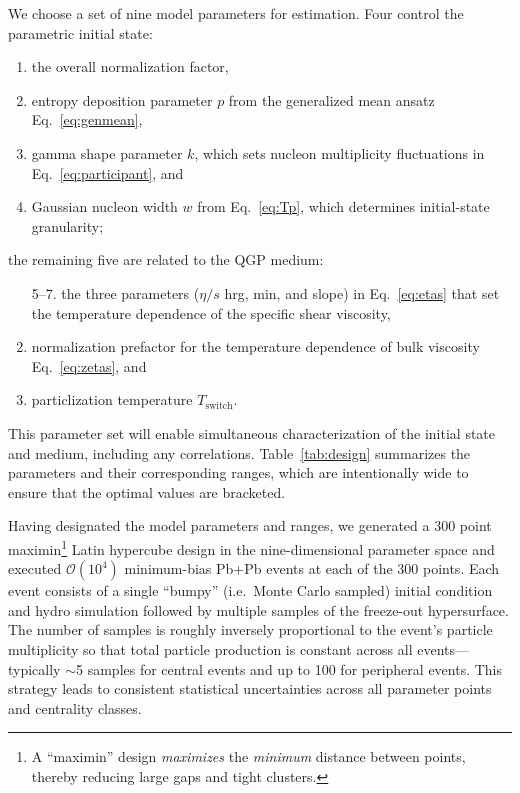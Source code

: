 \documentclass[aps,prc,reprint,amsmath,nofootinbib]{revtex4-1}
\newcommand{\order}[1]{$\mathcal O(10^{#1})$}
\begin{document}
We choose a set of nine model parameters for estimation.
Four control the parametric initial state:
\begin{enumerate}[itemsep=0pt]
  \item the overall normalization factor,
  \item entropy deposition parameter $p$ from the generalized mean ansatz Eq.~\eqref{eq:genmean},
  \item gamma shape parameter $k$, which sets nucleon multiplicity fluctuations in Eq.~\eqref{eq:participant}, and
  \item Gaussian nucleon width $w$ from Eq.~\eqref{eq:Tp}, which determines initial-state granularity;
\end{enumerate}
the remaining five are related to the QGP medium:
\begin{enumerate}[itemsep=0pt]
  \item[5--7.] the three parameters ($\eta/s$ hrg, min, and slope) in Eq.~\eqref{eq:etas} that set the temperature dependence of the specific shear viscosity,
  \setcounter{enumi}{7}
  \item normalization prefactor for the temperature dependence of bulk viscosity Eq.~\eqref{eq:zetas}, and
  \item particlization temperature $T_\text{switch}$.
\end{enumerate}
This parameter set will enable simultaneous characterization of the initial state and medium, including any correlations.
Table~\ref{tab:design} summarizes the parameters and their corresponding ranges, which are intentionally wide to ensure that the optimal values are bracketed.

Having designated the model parameters and ranges, we generated a 300 point maximin\footnote{A ``maximin'' design \emph{maximizes} the \emph{minimum} distance between points, thereby reducing large gaps and tight clusters.} Latin hypercube design \cite{Morris:1995lh} in the nine-dimensional parameter space and executed \order 4 minimum-bias Pb+Pb events at each of the 300 points.
Each event consists of a single ``bumpy'' (i.e.\ Monte Carlo sampled) initial condition and hydro simulation followed by multiple samples of the freeze-out hypersurface.
The number of samples is roughly inversely proportional to the event's particle multiplicity so that total particle production is constant across all events---typically ${\sim}$5 samples for central events and up to 100 for peripheral events.
This strategy leads to consistent statistical uncertainties across all parameter points and centrality classes.
\end{document}
